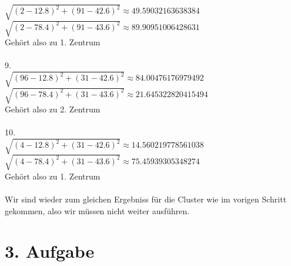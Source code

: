 \begin{enumerate}
$\sqrt{(2-12.8)^2 + (91-42.6)^2} \approx 49.59032163638384$ \\ 
$\sqrt{(2-78.4)^2 + (91-43.6)^2} \approx 89.90951006428631$ \\ 
Gehört also zu 1. Zentrum \\ \\
9. \\ 
$\sqrt{(96-12.8)^2 + (31-42.6)^2} \approx 84.00476176979492$ \\ 
$\sqrt{(96-78.4)^2 + (31-43.6)^2} \approx 21.645322820415494$ \\ 
Gehört also zu 2. Zentrum \\ \\
10. \\ 
$\sqrt{(4-12.8)^2 + (31-42.6)^2} \approx 14.560219778561038$ \\ 
$\sqrt{(4-78.4)^2 + (31-43.6)^2} \approx 75.45939305348274$ \\ 
Gehört also zu 1. Zentrum \\ \\

Wir sind wieder zum gleichen Ergebniss für die Cluster wie im vorigen Schritt gekommen, also wir müssen nicht weiter ausführen.

\end{enumerate}

\section*{3. Aufgabe}

